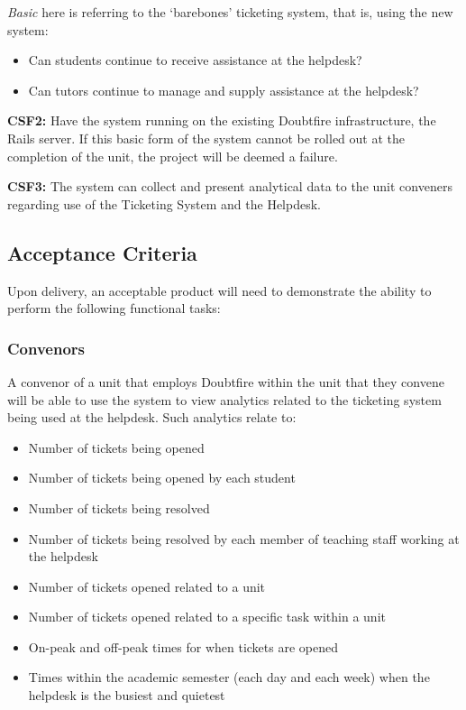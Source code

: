 \documentclass[a4paper,12pt]{article}
\providecommand{\tightlist}{%
  \setlength{\itemsep}{0pt}\setlength{\parskip}{0pt}}
\begin{document}
\emph{Basic} here is referring to the `barebones' ticketing system, that
is, using the new system:

\begin{itemize}
\tightlist
\item
  Can students continue to receive assistance at the helpdesk?
\item
  Can tutors continue to manage and supply assistance at the helpdesk?
\end{itemize}

\textbf{CSF2:} Have the system running on the existing Doubtfire
infrastructure, the Rails server. If this basic form of the system
cannot be rolled out at the completion of the unit, the project will be
deemed a failure.

\textbf{CSF3:} The system can collect and present analytical data to the
unit conveners regarding use of the Ticketing System and the Helpdesk.

\subsection{Acceptance Criteria}\label{acceptance-criteria}

Upon delivery, an acceptable product will need to demonstrate the
ability to perform the following functional tasks:

\subsubsection{Convenors}\label{convenors}

A convenor of a unit that employs Doubtfire within the unit that they
convene will be able to use the system to view analytics related to the
ticketing system being used at the helpdesk. Such analytics relate to:

\begin{itemize}
\tightlist
\item
  Number of tickets being opened
\item
  Number of tickets being opened by each student
\item
  Number of tickets being resolved
\item
  Number of tickets being resolved by each member of teaching staff
  working at the helpdesk
\item
  Number of tickets opened related to a unit
\item
  Number of tickets opened related to a specific task within a unit
\item
  On-peak and off-peak times for when tickets are opened
\item
  Times within the academic semester (each day and each week) when the
  helpdesk is the busiest and quietest
\end{itemize}
\end{document}
